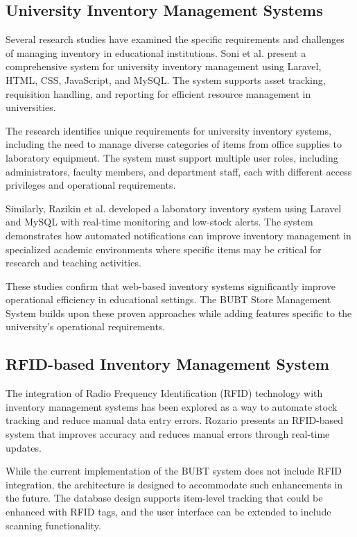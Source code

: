 \subsection{University Inventory Management Systems}

Several research studies have examined the specific requirements and challenges of managing inventory in educational institutions. Soni et al. \cite{university_inventory} present a comprehensive system for university inventory management using Laravel, HTML, CSS, JavaScript, and MySQL. The system supports asset tracking, requisition handling, and reporting for efficient resource management in universities.

The research identifies unique requirements for university inventory systems, including the need to manage diverse categories of items from office supplies to laboratory equipment. The system must support multiple user roles, including administrators, faculty members, and department staff, each with different access privileges and operational requirements.

Similarly, Razikin et al. \cite{laboratory_inventory} developed a laboratory inventory system using Laravel and MySQL with real-time monitoring and low-stock alerts. The system demonstrates how automated notifications can improve inventory management in specialized academic environments where specific items may be critical for research and teaching activities.

These studies confirm that web-based inventory systems significantly improve operational efficiency in educational settings. The BUBT Store Management System builds upon these proven approaches while adding features specific to the university's operational requirements.

\subsection{RFID-based Inventory Management System}

The integration of Radio Frequency Identification (RFID) technology with inventory management systems has been explored as a way to automate stock tracking and reduce manual data entry errors. Rozario \cite{rfid_inventory} presents an RFID-based system that improves accuracy and reduces manual errors through real-time updates.

While the current implementation of the BUBT system does not include RFID integration, the architecture is designed to accommodate such enhancements in the future. The database design supports item-level tracking that could be enhanced with RFID tags, and the user interface can be extended to include scanning functionality.

